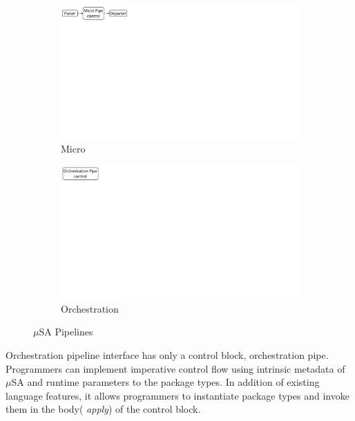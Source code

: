 \documentclass{hotnets19}
\begin{document}
\begin{figure}[!ht]
    \begin{subfigure}{0.45\linewidth}
        \centering
        \includegraphics[trim=0 482 692 0, clip,scale=0.45]{msa-pipeline}
        \caption{Micro}
        \label{subfig:micro}
    \end{subfigure}
    \begin{subfigure}{0.45\linewidth}
        \centering
        \includegraphics[trim=0 480 805 0,clip,scale=0.45]{micro-orchestration-pipeline}
        \caption{Orchestration}
        \label{subfig:orchestration}
    \end{subfigure}
\caption{$\mu$SA Pipelines}
\label{fig:msa-pipelines}
\end{figure}

Orchestration pipeline interface has only a control block, orchestration pipe.
Programmers can implement imperative control flow using intrinsic metadata of $\mu$SA and runtime parameters to the package types.
In addition of existing language features, it allows programmers to instantiate package types and invoke them in the body( \emph{apply}) of the control block.
\end{document}
